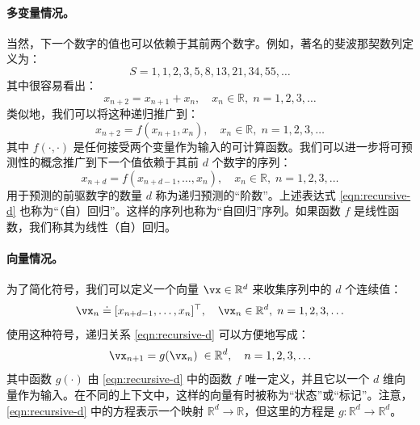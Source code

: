 \documentclass[../../book-main.tex]{subfiles}
\begin{document}
\paragraph{多变量情况。}
当然，下一个数字的值也可以依赖于其前两个数字。例如，著名的斐波那契数列定义为：
\begin{equation}
    {S} = 1, 1, 2, 3, 5, 8, 13, 21, 34, 55, \ldots
\end{equation}
其中很容易看出：
\begin{equation}
    x_{n+2} = x_{n+1} + x_{n}, \quad  x_n \in \mathbb{R}, \;  n = 1, 2, 3, \ldots
\end{equation}
类似地，我们可以将这种递归推广到：
\begin{equation}
    x_{n+2} = f(x_{n+1}, x_{n}), \quad x_n \in \mathbb{R}, \;  n =  1, 2, 3, \ldots
\end{equation}
其中 $f(\cdot,\cdot)$ 是任何接受两个变量作为输入的可计算函数。我们可以进一步将可预测性的概念推广到下一个值依赖于其前 $d$ 个数字的序列：
\begin{equation}
    x_{n+d} = f(x_{n+d-1}, \ldots,  x_{n}), \quad  x_n \in \mathbb{R}, \; n =  1, 2, 3, \ldots
    \label{eqn:recursive-d}
\end{equation}
用于预测的前驱数字的数量 $d$ 称为递归预测的“阶数”。上述表达式 \eqref{eqn:recursive-d} 也称为“（自）回归”。这样的序列也称为“自回归”序列。如果函数 $f$ 是线性函数，我们称其为线性（自）回归。

\paragraph{向量情况。} 
为了简化符号，我们可以定义一个向量 $\vx \in \mathbb{R}^d$ 来收集序列中的 $d$ 个连续值：
\begin{equation}
    \vx_n \doteq [x_{n+d-1}, \ldots,  x_{n}]^\top, \quad \vx_n \in \mathbb{R}^d, \; n = 1, 2, 3, \ldots
\end{equation}
使用这种符号，递归关系 \eqref{eqn:recursive-d} 可以方便地写成：
\begin{equation}
    \vx_{n+1} = g(\vx_{n}) \; \in \mathbb{R}^d, \quad n =  1, 2, 3, \ldots
    \label{eqn:recursive-v}
\end{equation}
其中函数 $g(\cdot)$ 由 \eqref{eqn:recursive-d} 中的函数 $f$ 唯一定义，并且它以一个 $d$ 维向量作为输入。在不同的上下文中，这样的向量有时被称为“状态”或“标记”。注意，\eqref{eqn:recursive-d} 中的方程表示一个映射 $\mathbb{R}^d \rightarrow \mathbb{R}$，但这里的方程是 $g: \mathbb{R}^d \rightarrow \mathbb{R}^d$。
\end{document}
